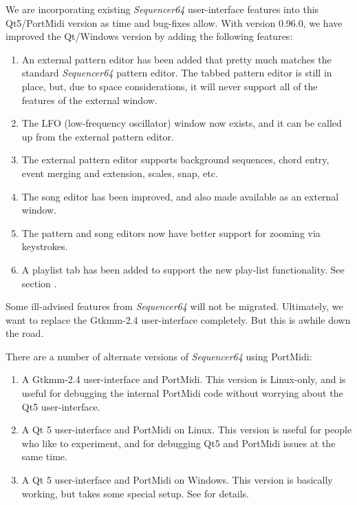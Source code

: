    We are incorporating existing \textsl{Sequencer64} user-interface
   features into this Qt5/PortMidi version as time and bug-fixes allow.
   With version 0.96.0, we have improved the Qt/Windows version by adding the
   following features:

   \begin{enumerate}
      \item An external pattern editor has been added that pretty much matches
         the standard \textsl{Sequencer64} pattern editor.  The tabbed
         pattern editor is still in place, but, due to space considerations,
         it will never support all of the features of the external window.
      \item The LFO (low-frequency oscillator) window now exists, and it can be
         called up from the external pattern editor.
      \item The external pattern editor supports background sequences, chord
         entry, event merging and extension, scales, snap, etc.
      \item The song editor has been improved, and also made available as an
         external window.
      \item The pattern and song editors now have better support for zooming
         via keystrokes.
      \item A playlist tab has been added to support the new play-list
         functionality.
         See section .
   \end{enumerate}
   Some ill-advised features from \textsl{Sequencer64} will not be migrated.
   Ultimately, we want to replace the Gtkmm-2.4 user-interface completely.
   But this is awhile down the road.

   There are a number of alternate versions of \textsl{Sequencer64} using
   PortMidi:

   \begin{enumerate}
      \item A Gtkmm-2.4 user-interface and PortMidi.  This version is
         Linux-only, and is useful for debugging the internal PortMidi code
         without worrying about the Qt5 user-interface.
      \item A Qt 5 user-interface and PortMidi on Linux.  This version is
         useful for people who like to experiment, and for debugging Qt5 and
         PortMidi issues at the same time.
      \item A Qt 5 user-interface and PortMidi on Windows.  This version is
         basically working, but takes some special setup.
         See  for details.
   \end{enumerate}

